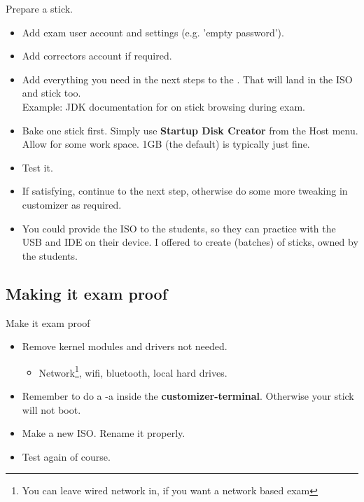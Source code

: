 \begin{frame}{Prepare a stick.}
  \begin{itemize}
  \item Add exam user account and settings (e.g. 'empty password').
  \item Add correctors account if required.
  \item Add everything you need in the next steps to the
    . That will land in the ISO and stick too.\\
    Example: JDK documentation for on stick browsing during exam.
  \item Bake one stick first. Simply use \textbf{Startup Disk Creator} from the
    Host menu. Allow for some work space. 1GB (the default) is
    typically just fine.
  \item Test it.
  \item If satisfying, continue to the next step, otherwise do some more
    tweaking in customizer as required.
  \item You could provide the ISO to the students, so they can
    practice with the USB and IDE on their device. I offered to
    create (batches) of sticks, owned by the students.
  \end{itemize}
\end{frame}

\subsection[EXAM proof]{Making it exam proof}
\begin{frame}{Make it exam proof}
  \begin{itemize}
  \item Remove kernel modules and drivers not needed.
    \begin{itemize}
    \item Network\footnote{You can leave wired network in, if you want
      a network based exam}, wifi, bluetooth, local hard drives.
    \end{itemize}
  \item Remember to do a  -a inside the
    \textbf{customizer-terminal}. Otherwise your stick will not boot.
  \item Make a new ISO. Rename it properly.
  \item Test again of course.
  \end{itemize}
\end{frame}

